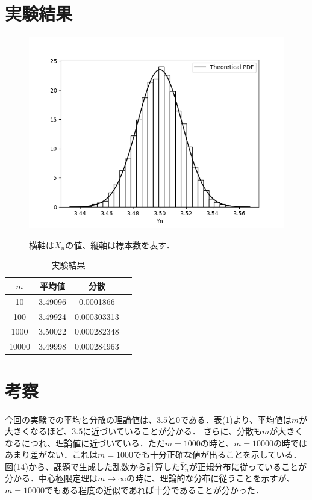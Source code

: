 \documentclass[fleqn, a4paper. 12pt]{ltjsarticle} %
\begin{document}
\section*{実験結果}
\begin{figure}[tb]
  \centering
  \includegraphics[width = \textwidth]{my_plot_4_2.png}
  \label{f12}
  \caption{横軸は$X_n$の値、縦軸は標本数を表す．}
\end{figure}
\begin{table}[h]
  \centering
  \begin{tabular}{cccc}
    \toprule
    $m$ & 平均値 & 分散 \\
    \midrule
    10    & 3.49096 & 0.0001866 \\
    100   & 3.49924 & 0.000303313 \\
    1000  & 3.50022 & 0.000282348 \\
    10000 & 3.49998 & 0.000284963 \\
    \bottomrule
  \end{tabular}
  \caption{実験結果}
  \label{tab:experiment_results}
\end{table}
\section*{考察}
今回の実験での平均と分散の理論値は、$3.5$と$0$である．表(1)より、平均値は$m$が大きくなるほど、$3.5$に近づいていることが分かる．
さらに、分散も$m$が大きくなるにつれ、理論値に近づいている．ただ$m=1000$の時と、$m=10000$の時ではあまり差がない．これは$m=1000$でも十分正確な値が出ることを示している．
図(14)から、課題で生成した乱数から計算した$\overline{Y}_n$が正規分布に従っていることが分かる．中心極限定理は$m \rightarrow \infty$の時に、理論的な分布に従うことを示すが、$m=10000$でもある程度の近似であれば十分であることが分かった．
\end{document}
